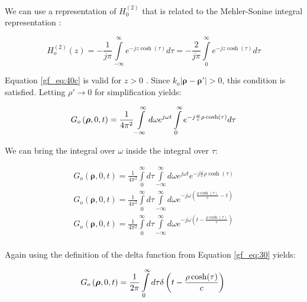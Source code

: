 We can use a representation of $H_0^{(2)}$ that is related to the Mehler-Sonine integral representation \cite{nist_handbook}:

\begin{equation}
H_o^{(2)}\left(z\right) = -\frac{1}{j\pi}\int\limits_{-\infty}^{\infty}e^{-jz\cosh(\tau)}d\tau = -\frac{2}{j\pi}\int\limits_{0}^{\infty}e^{-jz\cosh(\tau)}d\tau
\label{gf_eq:40c}
\end{equation}
\renewcommand{\baselinestretch}{2} \small\normalsize

\noindent Equation \ref{gf_eq:40c} is valid for $z>0$ . Since $k_o| \boldsymbol{\rho} - \boldsymbol{\rho}'| > 0$, this condition is satisfied. Letting $\rho' \rightarrow 0$ for simplification yields:

\begin{equation}
G_o\left(\boldsymbol{\rho},0,t\right) = \frac{1}{4\pi^2}\int\limits_{-\infty}^{\infty}d\omega e^{j\omega t} \int\limits_{0}^{\infty}e^{-j\frac{\omega}{c}\rho\cosh(\tau)}d\tau\\
\label{gf_eq:40d}
\end{equation}
\renewcommand{\baselinestretch}{2} \small\normalsize

\noindent We can bring the integral over $\omega$ inside the integral over $\tau$:

\begin{equation}
\begin{gathered}
G_o\left(\boldsymbol{\rho},0,t\right) = \frac{1}{4\pi^2}\int\limits_{0}^{\infty}d\tau\int\limits_{-\infty}^{\infty}d\omega e^{j\omega t} e^{-j\frac{\omega}{c}\rho\cosh(\tau)}\\
G_o\left(\boldsymbol{\rho},0,t\right) = \frac{1}{4\pi^2}\int\limits_{0}^{\infty}d\tau\int\limits_{-\infty}^{\infty}d\omega e^{-j\omega \left(\frac{\rho \cosh(\tau)}{c} - t\right)}\\
G_o\left(\boldsymbol{\rho},0,t\right) = \frac{1}{4\pi^2}\int\limits_{0}^{\infty}d\tau\int\limits_{-\infty}^{\infty}d\omega e^{-j\omega \left(t - \frac{\rho \cosh(\tau)}{c}\right)}\\
\end{gathered}
\label{gf_eq:40e}
\end{equation}
\renewcommand{\baselinestretch}{2} \small\normalsize

\noindent Again using the definition of the delta function from Equation \ref{gf_eq:30} yields:

\begin{equation}
G_o\left(\boldsymbol{\rho},0,t\right) = \frac{1}{2\pi}\int\limits_{0}^{\infty}d\tau \delta\left(t - \frac{\rho \cosh(\tau)}{c}\right)\\
\label{gf_eq:40f}
\end{equation}
\renewcommand{\baselinestretch}{2} \small\normalsize

